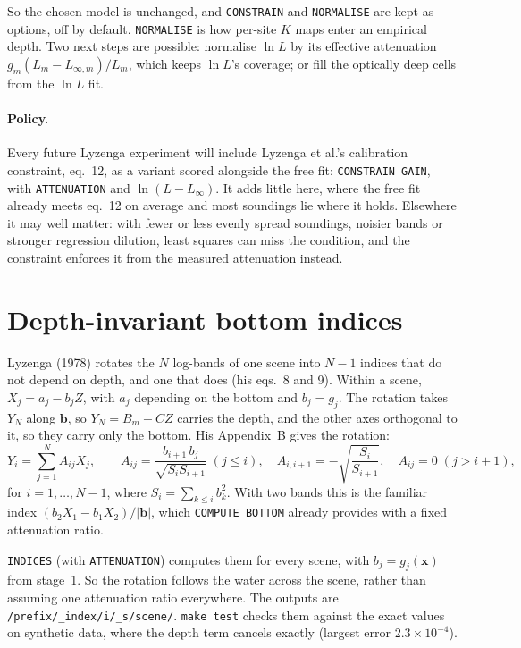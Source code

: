 \documentclass[11pt]{article}
\numberwithin{equation}{section}
\newcommand{\bx}{\mathbf{x}}
\newcommand{\code}[1]{\texttt{#1}}
\newcommand{\Lsm}[1]{L_{\infty,#1}}
\begin{document}
So the chosen model is unchanged, and \code{CONSTRAIN} and \code{NORMALISE} are kept as options,
off by default. \code{NORMALISE} is how per-site $K$ maps enter an empirical depth. Two next
steps are possible: normalise $\ln L$ by its effective attenuation $g_m(L_m - \Lsm{m})/L_m$,
which keeps $\ln L$'s coverage; or fill the optically deep cells from the $\ln L$ fit.

\paragraph{Policy.} Every future Lyzenga experiment will include Lyzenga et al.'s calibration
constraint, eq.~12, as a variant scored alongside the free fit: \code{CONSTRAIN GAIN}, with
\code{ATTENUATION} and $\ln(L - L_\infty)$. It adds little here, where the free fit already meets eq.~12 on average and
most soundings lie where it holds. Elsewhere it may well matter: with fewer or less evenly spread
soundings, noisier bands or stronger regression dilution, least squares can miss the condition,
and the constraint enforces it from the measured attenuation instead.

\section{Depth-invariant bottom indices}
\label{sec:indices}

Lyzenga (1978) rotates the $N$ log-bands of one scene into $N - 1$ indices that do not depend on
depth, and one that does (his eqs.~8 and 9). Within a scene, $X_j = a_j - b_j Z$, with $a_j$
depending on the bottom and $b_j = g_j$. The rotation takes $Y_N$ along $\mathbf{b}$, so
$Y_N = B_m - CZ$ carries the depth, and the other axes orthogonal to it, so they carry only the
bottom. His Appendix~B gives the rotation:
\begin{equation}
  Y_i = \sum_{j=1}^{N} A_{ij} X_j, \qquad
  A_{ij} = \frac{b_{i+1}\, b_j}{\sqrt{S_i S_{i+1}}} \;(j \le i), \quad
  A_{i,i+1} = -\sqrt{\frac{S_i}{S_{i+1}}}, \quad
  A_{ij} = 0 \;(j > i + 1),
\end{equation}
for $i = 1, \dots, N - 1$, where $S_i = \sum_{k \le i} b_k^2$. With two bands this is the familiar
index $(b_2 X_1 - b_1 X_2)/|\mathbf{b}|$, which \code{COMPUTE BOTTOM} already provides with a fixed
attenuation ratio.

\code{INDICES} (with \code{ATTENUATION}) computes them for every scene, with $b_j = g_j(\bx)$ from
stage~1. So the rotation follows the water across the scene, rather than assuming one attenuation
ratio everywhere. The outputs are \code{/prefix/\_index/i/\_s/scene/}. \code{make test} checks them
against the exact values on synthetic data, where the depth term cancels exactly (largest error
$2.3\times10^{-4}$).
\end{document}

